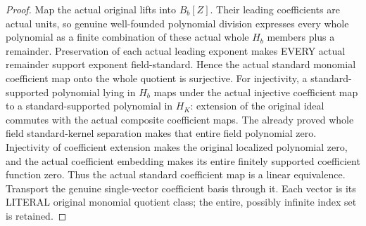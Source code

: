 \begin{proof}
Map the actual original lifts into $B_b[Z]$. Their leading coefficients are
actual units, so genuine well-founded polynomial division expresses every
whole polynomial as a finite combination of these actual whole $H_b$
members plus a remainder. Preservation of each actual leading exponent
makes EVERY actual remainder support exponent field-standard. Hence the
actual standard monomial coefficient map onto the whole quotient is
surjective. For injectivity, a standard-supported polynomial lying in $H_b$
maps under the actual injective coefficient map to a standard-supported
polynomial in $H_K$: extension of the original ideal commutes with the
actual composite coefficient maps. The already proved whole field
standard-kernel separation makes that entire field polynomial zero.
Injectivity of coefficient extension makes the original localized polynomial
zero, and the actual coefficient embedding makes its entire finitely
supported coefficient function zero. Thus the actual standard coefficient
map is a linear equivalence. Transport the genuine single-vector coefficient
basis through it. Each vector is its LITERAL original monomial quotient
class; the entire, possibly infinite index set is retained.
\end{proof}

